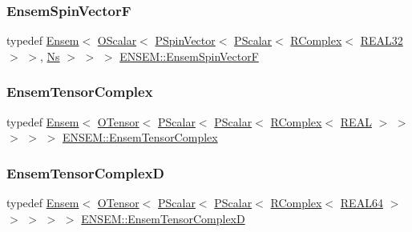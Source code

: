 \mbox{\label{group__defs_ga6e77c99e4a59f258b6920dcdc7e8b011}} 
\subsubsection{\texorpdfstring{EnsemSpinVectorF}{EnsemSpinVectorF}}
{\footnotesize\ttfamily typedef \mbox{\hyperlink{classENSEM_1_1Ensem}{Ensem}}$<$ \mbox{\hyperlink{classENSEM_1_1OScalar}{O\+Scalar}}$<$ \mbox{\hyperlink{classENSEM_1_1PSpinVector}{P\+Spin\+Vector}}$<$ \mbox{\hyperlink{classENSEM_1_1PScalar}{P\+Scalar}}$<$ \mbox{\hyperlink{classENSEM_1_1RComplex}{R\+Complex}}$<$ \mbox{\hyperlink{namespaceENSEM_a7540d01191172323e9073283d772576d}{R\+E\+A\+L32}} $>$ $>$, \mbox{\hyperlink{namespaceENSEM_a6f05e048f9b2eb1a19131074f8abc25f}{Ns}} $>$ $>$ $>$ \mbox{\hyperlink{group__defs_ga6e77c99e4a59f258b6920dcdc7e8b011}{E\+N\+S\+E\+M\+::\+Ensem\+Spin\+VectorF}}}

\mbox{\label{group__defs_ga3d22b4deb8e2322433882b290ff83364}} 
\subsubsection{\texorpdfstring{EnsemTensorComplex}{EnsemTensorComplex}}
{\footnotesize\ttfamily typedef \mbox{\hyperlink{classENSEM_1_1Ensem}{Ensem}}$<$ \mbox{\hyperlink{classENSEM_1_1OTensor}{O\+Tensor}}$<$ \mbox{\hyperlink{classENSEM_1_1PScalar}{P\+Scalar}}$<$ \mbox{\hyperlink{classENSEM_1_1PScalar}{P\+Scalar}}$<$ \mbox{\hyperlink{classENSEM_1_1RComplex}{R\+Complex}}$<$ \mbox{\hyperlink{namespaceENSEM_a6dd9aa6508168f545c861787e63ddd1e}{R\+E\+AL}} $>$ $>$ $>$ $>$ $>$ \mbox{\hyperlink{group__defs_ga3d22b4deb8e2322433882b290ff83364}{E\+N\+S\+E\+M\+::\+Ensem\+Tensor\+Complex}}}

\mbox{\label{group__defs_ga15d48d3a11743bbf79e7b90cf889f3f0}} 
\subsubsection{\texorpdfstring{EnsemTensorComplexD}{EnsemTensorComplexD}}
{\footnotesize\ttfamily typedef \mbox{\hyperlink{classENSEM_1_1Ensem}{Ensem}}$<$ \mbox{\hyperlink{classENSEM_1_1OTensor}{O\+Tensor}}$<$ \mbox{\hyperlink{classENSEM_1_1PScalar}{P\+Scalar}}$<$ \mbox{\hyperlink{classENSEM_1_1PScalar}{P\+Scalar}}$<$ \mbox{\hyperlink{classENSEM_1_1RComplex}{R\+Complex}}$<$ \mbox{\hyperlink{namespaceENSEM_a85b215b9f1f43715aebee01718e25082}{R\+E\+A\+L64}} $>$ $>$ $>$ $>$ $>$ \mbox{\hyperlink{group__defs_ga15d48d3a11743bbf79e7b90cf889f3f0}{E\+N\+S\+E\+M\+::\+Ensem\+Tensor\+ComplexD}}}

